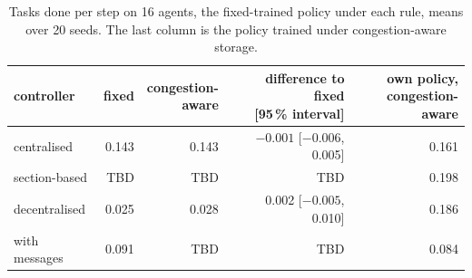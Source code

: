 \begin{table}[H]
  \centering
  \small
  \setlength{\tabcolsep}{4pt}
  \caption{Tasks done per step on 16 agents, the fixed-trained policy under each rule, means over
  20 seeds. The last column is the policy trained under congestion-aware storage.}
  \label{tab:app:regime1:16}
  \begin{tabular}{lrrrr}
    \toprule
    controller & fixed & \shortstack{congestion-\\aware} & \shortstack{difference to fixed\\{[95\,\% interval]}} & \shortstack{own policy,\\congestion-aware} \\
    \midrule
    centralised    & 0.143 & 0.143 & $-0.001$ [$-0.006$, 0.005] & 0.161 \\
    section-based  & TBD   & TBD   & TBD                        & 0.198 \\
    decentralised  & 0.025 & 0.028 & 0.002 [$-0.005$, 0.010]    & 0.186 \\
    with messages  & 0.091 & TBD   & TBD                        & 0.084 \\
    \bottomrule
  \end{tabular}
\end{table}

